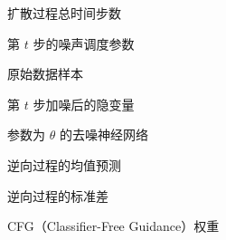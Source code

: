 \begin{denotation}[3cm]
\item[$ T $]  扩散过程总时间步数
\item[$ \beta_t $]  第 $ t $ 步的噪声调度参数
\item[$ x_0 $]  原始数据样本
\item[$ x_t $]  第 $ t $ 步加噪后的隐变量
\item[$ \epsilon_\theta $]  参数为 $ \theta $ 的去噪神经网络
\item[$ \mu_\theta $]  逆向过程的均值预测
\item[$ \sigma_t $]  逆向过程的标准差
\item[$ w $]  CFG（Classifier-Free Guidance）权重

\end{denotation}
